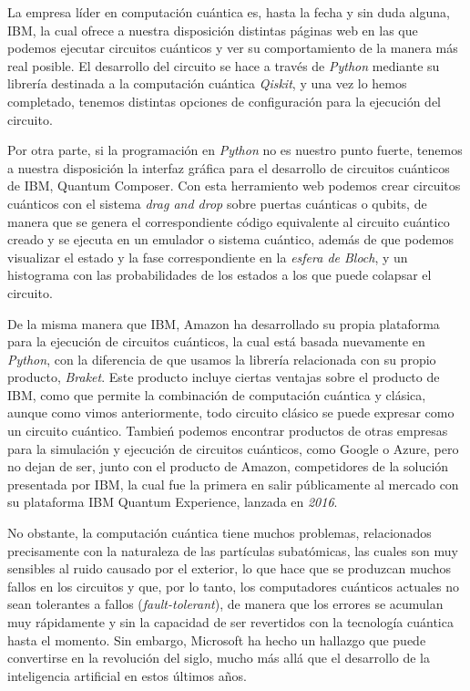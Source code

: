 \documentclass{article}
\numberwithin{equation}{section} %
\begin{document}
    \vspace{5mm}

    La empresa líder en computación cuántica es, hasta la fecha y sin duda alguna, IBM, la cual ofrece a nuestra disposición distintas páginas web en las que podemos ejecutar circuitos cuánticos y ver su comportamiento de la manera más real posible. El desarrollo del circuito se hace a través de \textit{Python} mediante su librería destinada a la computación cuántica \textit{Qiskit}, y una vez lo hemos completado, tenemos distintas opciones de configuración para la ejecución del circuito.

    \vspace{5mm}

    Por otra parte, si la programación en \textit{Python} no es nuestro punto fuerte, tenemos a nuestra disposición la interfaz gráfica para el desarrollo de circuitos cuánticos de IBM, Quantum Composer. Con esta herramiento web podemos crear circuitos cuánticos con el sistema \textit{drag and drop} sobre puertas cuánticas o qubits, de manera que se genera el correspondiente código equivalente al circuito cuántico creado y se ejecuta en un emulador o sistema cuántico, además de que podemos visualizar el estado y la fase correspondiente en la \textit{esfera de Bloch}, y un histograma con las probabilidades de los estados a los que puede colapsar el circuito.
    
    \vspace{5mm}

    De la misma manera que IBM, Amazon ha desarrollado su propia plataforma para la ejecución de circuitos cuánticos, la cual está basada nuevamente en \textit{Python}, con la diferencia de que usamos la librería relacionada con su propio producto, \textit{Braket}. Este producto incluye ciertas ventajas sobre el producto de IBM, como que permite la combinación de computación cuántica y clásica, aunque como vimos anteriormente, todo circuito clásico se puede expresar como un circuito cuántico. Tambień podemos encontrar productos de otras empresas para la simulación y ejecución de circuitos cuánticos, como Google o Azure, pero no dejan de ser, junto con el producto de Amazon, competidores de la solución presentada por IBM, la cual fue la primera en salir públicamente al mercado con su plataforma IBM Quantum Experience, lanzada en \textit{2016}.

    \vspace{5mm}

    No obstante, la computación cuántica tiene muchos problemas, relacionados precisamente con la naturaleza de las partículas subatómicas, las cuales son muy sensibles al ruido causado por el exterior, lo que hace que se produzcan muchos fallos en los circuitos y que, por lo tanto, los computadores cuánticos actuales no sean tolerantes a fallos (\textit{fault-tolerant}), de manera que los errores se acumulan muy rápidamente y sin la capacidad de ser revertidos con la tecnología cuántica hasta el momento. Sin embargo, Microsoft ha hecho un hallazgo que puede convertirse en la revolución del siglo, mucho más allá que el desarrollo de la inteligencia artificial en estos últimos años.
\end{document}
